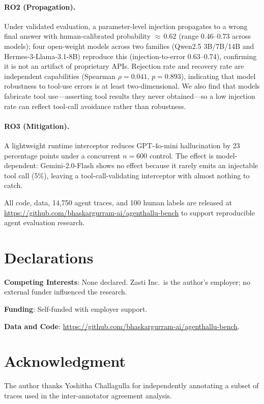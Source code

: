 \documentclass{ieeeaccess}
\begin{document}
\paragraph{RO2 (Propagation).}
Under validated evaluation, a parameter-level injection propagates to a
wrong final answer with human-calibrated probability ${\approx}\,0.62$
(range 0.46--0.73 across models); four open-weight models across two families
(Qwen2.5 3B/7B/14B and Hermes-3-Llama-3.1-8B) reproduce this (injection-to-error
0.63--0.74), confirming it is not an
artifact of proprietary APIs.
Rejection rate and recovery rate are independent capabilities
(Spearman $\rho{=}0.041$, $p{=}0.893$), indicating that model
robustness to tool-use errors is at least two-dimensional. We also find
that models fabricate tool use---asserting tool results they never
obtained---so a low injection rate can reflect tool-call avoidance rather
than robustness.

\paragraph{RO3 (Mitigation).}
A lightweight runtime interceptor reduces GPT-4o-mini hallucination by
23 percentage points under a concurrent $n{=}600$ control.
The effect is model-dependent: Gemini-2.0-Flash shows no effect because it
rarely emits an injectable tool call (5\%), leaving a tool-call-validating
interceptor with almost nothing to catch.

All code, data, 14{,}750 agent traces, and 100 human labels are released at
\url{https://github.com/bhaskargurram-ai/agenthallu-bench} to support
reproducible agent evaluation research.


\section*{Declarations}

\textbf{Competing Interests}: None declared. Zasti Inc.\ is the
author's employer; no external funder influenced the research.

\textbf{Funding}: Self-funded with employer support.

\textbf{Data and Code}: \url{https://github.com/bhaskargurram-ai/agenthallu-bench}.



\section*{Acknowledgment}
The author thanks Yoshitha Challagulla for independently annotating a subset of
traces used in the inter-annotator agreement analysis.
\end{document}
